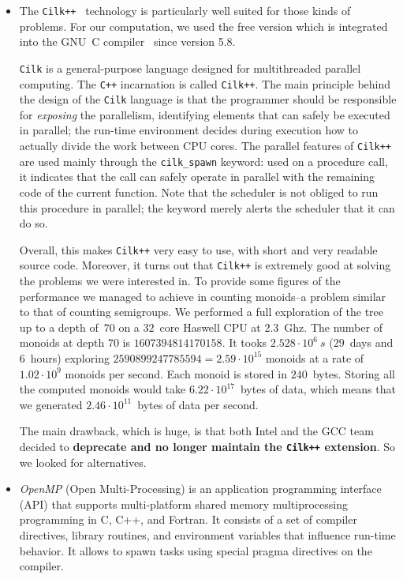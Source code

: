 \documentclass{deliverablereport}
\newcommand{\Cilk}{\texttt{Cilk}\xspace}
\newcommand{\CilkP}{\texttt{Cilk++}\xspace}
\newcommand{\CPP}{\texttt{C++}\xspace}
\begin{document}
\begin{itemize}
\item The \CilkP~\cite{CilkIntel} technology is particularly well suited for
  those kinds of problems. For our computation, we used the free version which
  is integrated into the GNU~C compiler~\cite{GCCcilk} since version 5.8.

  \Cilk is a general-purpose language designed for multithreaded parallel
  computing. The \CPP incarnation is called \CilkP. The main principle
  behind the design of the \Cilk language is that the programmer should be
  responsible for \emph{exposing} the parallelism, identifying elements that
  can safely be executed in parallel; the run-time environment decides during
  execution how to actually divide the work between CPU cores. The parallel
  features of \CilkP are used mainly through the \texttt{cilk\_spawn} keyword:
  used on a procedure call, it indicates that the call can safely operate in
  parallel with the remaining code of the current function. Note that the
  scheduler is not obliged to run this procedure in parallel; the keyword
  merely alerts the scheduler that it can do so.

  Overall, this makes \CilkP very easy to use, with short and very readable
  source code. Moreover, it turns out that \CilkP is extremely good at solving
  the problems we were interested in. To provide some figures of the performance we managed
  to achieve in counting monoids--a problem similar to that of counting
  semigroups. We performed a full exploration of the tree up to a depth of~$70$ on
  a $32$~core Haswell CPU at $2.3$~Ghz. The number of monoids at depth $70$ is
  $1607394814170158$.  It tooks $2.528\cdot10^{6}~s$ ($29$~days and $6$~hours)
  exploring $2590899247785594=2.59\cdot10^{15}$ monoids at a rate of
  $1.02\cdot10^{9}$ monoids per second. Each monoid is stored in
  $240$~bytes. Storing all the computed monoids would take
  $6.22\cdot10^{17}$~bytes of data, which means that we generated
  $2.46\cdot10^{11}$~bytes of data per second.

  The main drawback, which is huge, is that both Intel and the GCC team decided
  to \textbf{deprecate and no longer maintain the \CilkP extension}. So we
  looked for alternatives.


\item \emph{OpenMP} (Open Multi-Processing) is an application programming
  interface (API) that supports multi-platform shared memory multiprocessing
  programming in C, C++, and Fortran. It consists of a set of compiler
  directives, library routines, and environment variables that influence
  run-time behavior. It allows to spawn tasks using special pragma directives on the
  compiler.


\end{itemize}
\end{document}
